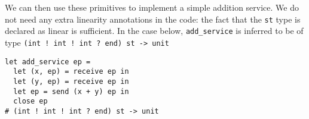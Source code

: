 
We can then use these primitives to implement a simple addition service.
We do not need any extra linearity annotations in the code: the fact
that the \texttt{st} type is declared as linear is sufficient.
In the case below, \lstinline{add_service} is inferred to be of type
\lstinline{(int ! int ! int ? end) st -> unit}

\begin{lstlisting}
let add_service ep =
  let (x, ep) = receive ep in
  let (y, ep) = receive ep in
  let ep = send (x + y) ep in
  close ep
# (int ! int ! int ? end) st -> unit
\end{lstlisting}





